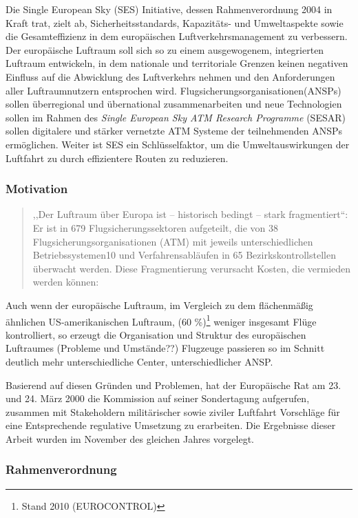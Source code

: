 

Die Single European Sky (SES) Initiative, dessen Rahmenverordnung 2004 in Kraft trat, zielt ab, Sicherheitsstandards, Kapazitäts- und Umweltaspekte sowie die Gesamteffizienz in dem europäischen Luftverkehrsmanagement zu verbessern.
Der europäische Luftraum soll sich so zu einem ausgewogenem, integrierten Luftraum entwickeln, in dem nationale und territoriale Grenzen keinen negativen Einfluss auf die Abwicklung des Luftverkehrs nehmen und den Anforderungen aller Luftraumnutzern entsprochen wird. \cite[Art. 1 Abs. 1]{2004R0549}
Flugsicherungsorganisationen(ANSPs) sollen überregional und übernational zusammenarbeiten und neue Technologien sollen im Rahmen des \textit{Single European Sky ATM Research Programme} (SESAR) sollen digitalere und stärker vernetzte ATM Systeme der teilnehmenden ANSPs ermöglichen.
Weiter ist SES ein Schlüsselfaktor, um die Umweltauswirkungen der Luftfahrt zu durch effizientere Routen zu reduzieren.  

\subsubsection{Motivation}
\begin{quote}
,,Der Luftraum über Europa ist – historisch bedingt – stark fragmentiert``:  Er ist in 679 Flugsicherungssektoren aufgeteilt, die von 38 Flugsicherungsorganisationen (ATM) mit jeweils unterschiedlichen
Betriebssystemen10 und Verfahrensabläufen in 65 Bezirkskontrollstellen überwacht werden. Diese Fragmentierung verursacht Kosten, die vermieden werden können:
\cite[S.6]{eu_ses_studie} 
\end{quote}
\noindent
Auch wenn der europäische Luftraum, im Vergleich zu dem flächenmäßig ähnlichen US-amerikanischen Luftraum, (60 \%)\footnote{Stand 2010 (EUROCONTROL)} weniger insgesamt Flüge kontrolliert, so erzeugt die Organisation und Struktur des europäischen Luftraumes (Probleme und Umstände??)
Flugzeuge passieren so im Schnitt deutlich mehr unterschiedliche Center, unterschiedlicher ANSP. 
\cite[S. 74]{eu_ses_fab}


Basierend auf diesen Gründen und Problemen, hat der Europäische Rat am 23. und 24. März 2000 die Kommission auf seiner Sondertagung aufgerufen, zusammen mit Stakeholdern militärischer sowie ziviler Luftfahrt Vorschläge für eine Entsprechende regulative Umsetzung zu erarbeiten.
Die Ergebnisse dieser Arbeit wurden im November des gleichen Jahres vorgelegt.
\cite[Prä. Abs. 2]{2004R0549}


\pagebreak
\subsubsection{Rahmenverordnung}

